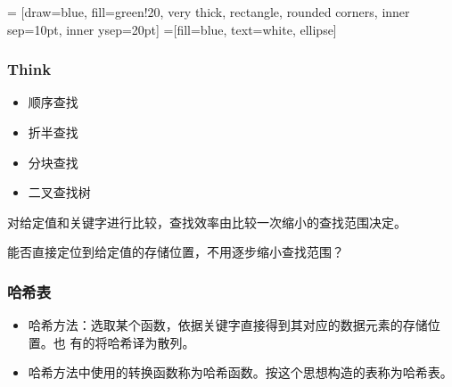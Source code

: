 \begin{frame}[plain]
  \frametitle{}
  \centering
   = [draw=blue, fill=green!20, very thick,
  rectangle, rounded corners, inner sep=10pt, inner ysep=20pt]
   =[fill=blue, text=white, ellipse]
  
  \vspace{1.0cm}
\end{frame}

\begin{frame}[fragile]
  \frametitle{Think}
  \begin{itemize}
  \item 顺序查找
  \item 折半查找
  \item 分块查找
  \item 二叉查找树
  \end{itemize}
  
  对给定值和关键字进行比较，查找效率由比较一次缩小的查找范围决定。

  能否直接定位到给定值的存储位置，不用逐步缩小查找范围？
\end{frame}

\begin{frame}[fragile]
  \frametitle{哈希表}
  \begin{itemize}
  \item 哈希方法：选取某个函数，依据关键字直接得到其对应的数据元素的存储位置。也
    有的将哈希译为散列。
  \item 哈希方法中使用的转换函数称为哈希函数。按这个思想构造的表称为哈希表。
  \end{itemize}
\end{frame}

